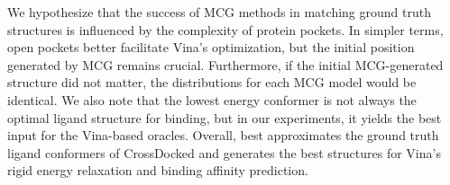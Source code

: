 We hypothesize that the success of MCG methods in matching ground truth structures is influenced by the complexity of protein pockets. In simpler terms, open pockets better facilitate Vina's optimization, but the initial position generated by MCG remains crucial.
Furthermore, if the initial MCG-generated structure did not matter, the distributions for each MCG model would be identical.
We also note that the lowest energy conformer is not always the optimal ligand structure for binding, but in our experiments, it yields the best input for the Vina-based oracles. 
Overall, \model best approximates the ground truth ligand conformers of CrossDocked and generates the best structures for Vina's rigid energy relaxation and binding affinity prediction.
\vspace{-1ex}
